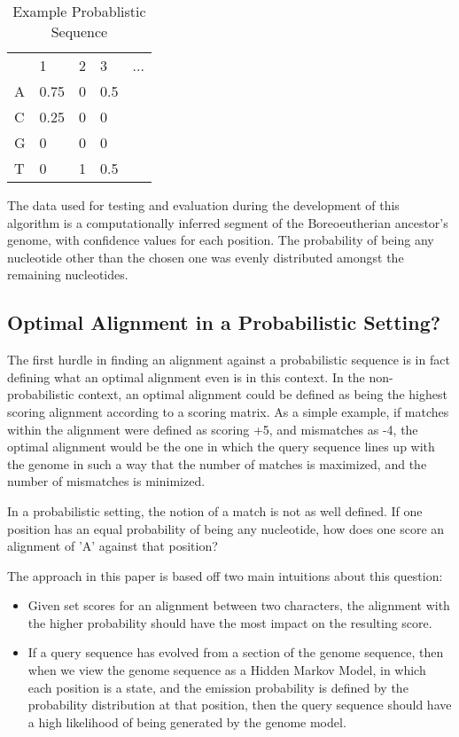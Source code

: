 \documentclass[12pt, conference]{IEEEtran}
\begin{document}
\begin{table}[htbp]
\centering
\caption{Example Probablistic Sequence}
\label{my-label}
\begin{tabular}{lllll}
  & 1    & 2 & 3   & ... \\
A & 0.75 & 0 & 0.5 &     \\
C & 0.25 & 0 & 0   &     \\
G & 0    & 0 & 0   &     \\
T & 0    & 1 & 0.5 &    
\end{tabular}
\end{table}

	The data used for testing and evaluation during the development of this algorithm is a computationally inferred segment of the Boreoeutherian ancestor's genome, with confidence values for each position. The probability of being any nucleotide other than the chosen one was evenly distributed amongst the remaining nucleotides.

	\subsection{\textbf{Optimal Alignment in a Probabilistic Setting?}}
	
	The first hurdle in finding an alignment against a probabilistic sequence is in fact defining what an optimal alignment even is in this context. In the non-probabilistic context, an optimal alignment could be defined as being the highest scoring alignment according to a scoring matrix. As a simple example, if matches within the alignment were defined as scoring +5, and mismatches as -4, the optimal alignment would be the one in which the query sequence lines up with the genome in such a way that the number of matches is maximized, and the number of mismatches is minimized.
	
	In a probabilistic setting, the notion of a match is not as well defined. If one position has an equal probability of being any nucleotide, how does one score an alignment of 'A' against that position?
	
	The approach in this paper is based off two main intuitions about this question:
	
	\begin{itemize}
		\item Given set scores for an alignment between two characters, the alignment with the higher probability should have the most impact on the resulting score.
		\item If a query sequence has evolved from a section of the genome sequence, then when we view the genome sequence as a Hidden Markov Model, in which each position is a state, and the emission probability is defined by the probability distribution at that position, then the query sequence should have a high likelihood of being generated by the genome model.
	\end{itemize}
\end{document}
